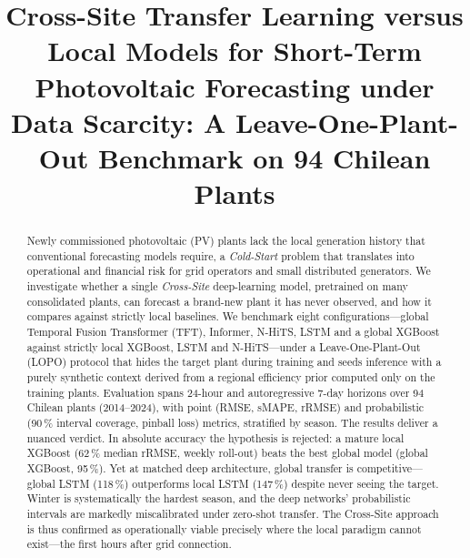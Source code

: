 \documentclass[conference]{IEEEtran}
\begin{document}
\title{Cross-Site Transfer Learning versus Local Models for Short-Term Photovoltaic
Forecasting under Data Scarcity: A Leave-One-Plant-Out Benchmark on 94 Chilean Plants}

\author{
}

\maketitle

\begin{abstract}
Newly commissioned photovoltaic (PV) plants lack the local generation history that
conventional forecasting models require, a \emph{Cold-Start} problem that translates into
operational and financial risk for grid operators and small distributed generators. We
investigate whether a single \emph{Cross-Site} deep-learning model, pretrained on many
consolidated plants, can forecast a brand-new plant it has never observed, and how it
compares against strictly local baselines. We benchmark eight configurations---global
Temporal Fusion Transformer (TFT), Informer, N-HiTS, LSTM and a global XGBoost against
strictly local XGBoost, LSTM and N-HiTS---under a Leave-One-Plant-Out (LOPO) protocol that
hides the target plant during training and seeds inference with a purely synthetic context
derived from a regional efficiency prior computed only on the training plants. Evaluation
spans 24-hour and autoregressive 7-day horizons over 94 Chilean plants (2014--2024), with
point (RMSE, sMAPE, rRMSE) and probabilistic (90\,\% interval coverage, pinball loss)
metrics, stratified by season. The results deliver a nuanced verdict. In absolute accuracy
the hypothesis is rejected: a mature local XGBoost (62\,\% median rRMSE, weekly roll-out)
beats the best global model (global XGBoost, 95\,\%). Yet at matched deep architecture,
global transfer is competitive---global LSTM (118\,\%) outperforms local LSTM
(147\,\%) despite never seeing the target. Winter is systematically the hardest season, and
the deep networks' probabilistic intervals are markedly miscalibrated under zero-shot
transfer. The Cross-Site approach is thus confirmed as operationally viable precisely where
the local paradigm cannot exist---the first hours after grid connection.
\end{abstract}
\end{document}
